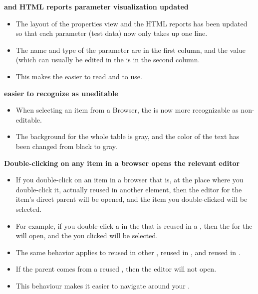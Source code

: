 \textbf{\gdpropview{} and HTML reports parameter visualization updated}\\
\begin{itemize}
\item The layout of the properties view and the HTML reports has been updated so that each parameter (test data) now only takes up one line. 
\item The name and type of the parameter are in the first column, and the value (which can usually be edited in the \gdpropview{} is in the second column.
\item This makes the \gdpropview{} easier to read and to use. 
\end{itemize}

\textbf{\gdpropview{} easier to recognize as uneditable}\\
\begin{itemize}
\item When selecting an item from a Browser, the \gdpropview{} is now more recognizable as non-editable.
\item The background for the whole table is gray, and the color of the text has been changed from black to gray.
\end{itemize}

\textbf{Double-clicking on any item in a browser opens the relevant editor}
\begin{itemize}
\item If you double-click on an item in a browser that is, at the place where you double-click it, actually reused in another element, then the editor for the item's direct parent will be opened, and the item you double-clicked will be selected. 
\item For example, if you double-click a \gdcase{} in the \gdtestsuitebrowser{} that is reused in a \gdsuite{}, then the \gdtestsuiteeditor{} for the \gdsuite{} will open, and the \gdcase{} you clicked will be selected.
\item The same behavior applies to \gdcases{} reused in other \gdcases{}, \gdsuites{} reused in \gdjobs{}, and \gdehandlers{} reused in \gdcases{}. 
\item If the parent comes from a reused \gdproject{}, then the editor will not open.
\item This behaviour makes it easier to navigate around your \gdproject{}. 
\end{itemize}

